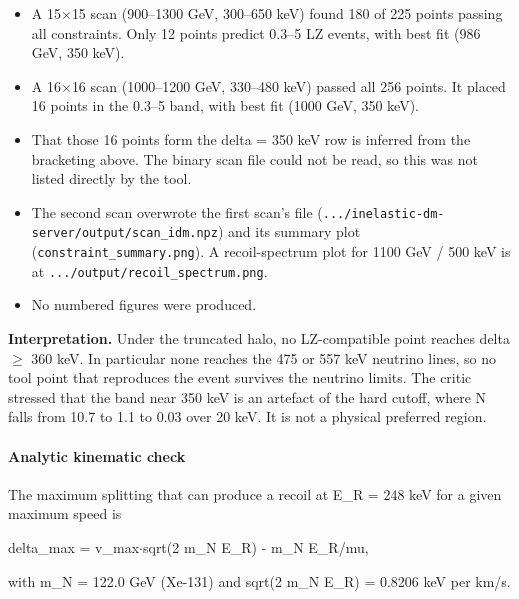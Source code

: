 \documentclass[11pt,a4paper]{article}
\begin{document}
\begin{itemize}
  \item A 15$\times$15 scan (900--1300 GeV, 300--650 keV) found 180 of 225 points passing all constraints. Only 12 points predict 0.3--5 LZ events, with best fit (986 GeV, 350 keV).
  \item A 16$\times$16 scan (1000--1200 GeV, 330--480 keV) passed all 256 points. It placed 16 points in the 0.3--5 band, with best fit (1000 GeV, 350 keV).
  \item That those 16 points form the delta = 350 keV row is inferred from the bracketing above. The binary scan file could not be read, so this was not listed directly by the tool.
  \item The second scan overwrote the first scan's file (\texttt{.../\allowbreak{}inelastic-dm-server/\allowbreak{}output/\allowbreak{}scan\_\allowbreak{}idm.npz}) and its summary plot (\texttt{constraint\_\allowbreak{}summary.png}). A recoil-spectrum plot for 1100 GeV / 500 keV is at \texttt{.../\allowbreak{}output/\allowbreak{}recoil\_\allowbreak{}spectrum.png}.
  \item No numbered figures were produced.
\end{itemize}
\textbf{Interpretation.} Under the truncated halo, no LZ-compatible point reaches delta $\geq$ 360 keV. In particular none reaches the 475 or 557 keV neutrino lines, so no tool point that reproduces the event survives the neutrino limits. The critic stressed that the band near 350 keV is an artefact of the hard cutoff, where N falls from 10.7 to 1.1 to 0.03 over 20 keV. It is not a physical preferred region.

\paragraph{Analytic kinematic check}
The maximum splitting that can produce a recoil at E\_R = 248 keV for a given maximum speed is

delta\_max = v\_max$\cdot$sqrt(2 m\_N E\_R) - m\_N E\_R/mu,

with m\_N = 122.0 GeV (Xe-131) and sqrt(2 m\_N E\_R) = 0.8206 keV per km/s.
\end{document}
